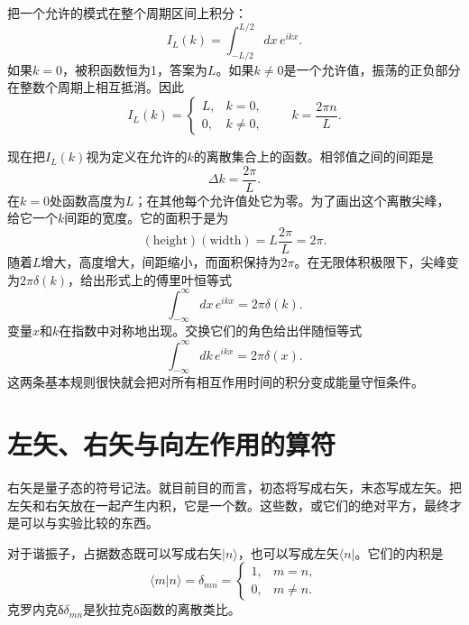 把一个允许的模式在整个周期区间上积分：
\begin{equation}
I_L(k)=\int_{-L/2}^{L/2}dx\,e^{ikx}.
\end{equation}
如果\(k=0\)，被积函数恒为1，答案为\(L\)。如果\(k\neq0\)是一个允许值，振荡的正负部分在整数个周期上相互抵消。因此
\begin{equation}
I_L(k)=
\begin{cases}
L,&k=0,\\[4pt]
0,&k\neq0,
\end{cases}
\qquad
k=\frac{2\pi n}{L}.
\end{equation}

现在把\(I_L(k)\)视为定义在允许的\(k\)的离散集合上的函数。相邻值之间的间距是
\begin{equation}
\Delta k=\frac{2\pi}{L}.
\end{equation}
在\(k=0\)处函数高度为\(L\)；在其他每个允许值处它为零。为了画出这个离散尖峰，给它一个\(k\)间距的宽度。它的面积于是为
\begin{equation}
(\text{height})(\text{width})
=L\frac{2\pi}{L}=2\pi.
\end{equation}
随着\(L\)增大，高度增大，间距缩小，而面积保持为\(2\pi\)。在无限体积极限下，尖峰变为\(2\pi\delta(k)\)，给出形式上的傅里叶恒等式
\begin{equation}
\int_{-\infty}^{\infty}dx\,e^{ikx}=2\pi\delta(k).
\end{equation}
变量\(x\)和\(k\)在指数中对称地出现。交换它们的角色给出伴随恒等式
\begin{equation}
\int_{-\infty}^{\infty}dk\,e^{ikx}=2\pi\delta(x).
\end{equation}
这两条基本规则很快就会把对所有相互作用时间的积分变成能量守恒条件。

\section{左矢、右矢与向左作用的算符}

右矢是量子态的符号记法。就目前目的而言，初态将写成右矢，末态写成左矢。把左矢和右矢放在一起产生内积，它是一个数。这些数，或它们的绝对平方，最终才是可以与实验比较的东西。

\begin{classroomqa}
\end{classroomqa}

对于谐振子，占据数态既可以写成右矢\(\lvert n\rangle\)，也可以写成左矢\(\langle n\rvert\)。它们的内积是
\begin{equation}
\langle m\vert n\rangle=\delta_{mn}
=\begin{cases}
1,&m=n,\\
0,&m\neq n.
\end{cases}
\end{equation}
克罗内克{\proseunicodefont δ}\(\delta_{mn}\)是狄拉克{\proseunicodefont δ}函数的离散类比。

